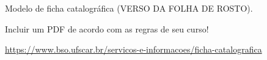 

%   

\begin{fichacatalografica}
  \begin{destaque}
    \large
    \centering
    Modelo de ficha catalográfica (VERSO DA FOLHA DE ROSTO).
    \vspace*{2cm}

    Incluir um PDF de acordo com as regras de seu curso!
    \vspace*{2cm}

    \Large
    \url{https://www.bso.ufscar.br/servicos-e-informacoes/ficha-catalografica}
  \end{destaque}
\end{fichacatalografica}

\cleardoublepage

